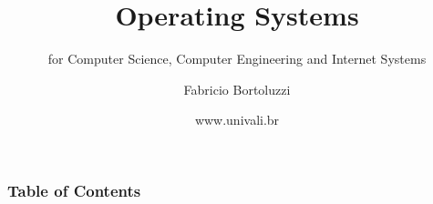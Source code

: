 \documentclass{beamer}
\title[Operating Systems] %
{Operating Systems}
\subtitle{for Computer Science, 
    Computer Engineering 
    and Internet Systems}
\author[Bortoluzzi] %
{Fabricio Bortoluzzi\inst{1}}
\institute[UNIVALI] %
{
  \inst{1}%
  Computer Networks Laboratory\\
  Laboratory of Embedded and Distributed Systems\\
}
\date[UNIVALI 2019] %
{www.univali.br}
\begin{document}
\frame{\titlepage}


\begin{frame}
\frametitle{Table of Contents}
\tableofcontents
\end{frame}







%
\end{document}
